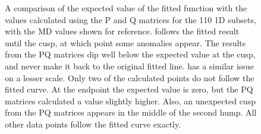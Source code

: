 \documentclass[twoside,senior]{BYUPhys}
\begin{document}
\begin{figure}[ht!]
 \centering
 
 \quad
 \caption[Comparison of the PQ matrices with the expected result for \textlangle{}110\textrangle{} 1D subset.]{\label{appfig:110PQ} A comparison of the expected value of the fitted function with the values calculated using the P and Q matrices for the \textlangle{}110\textrangle{} 1D subsets, with the MD values shown for reference.  \protect{} follows the fitted result until the cusp, at which point some anomalies appear.  The results from the PQ matrices dip well below the expected value at the cusp, and never make it back to the original fitted line. \protect{} has a similar issue on a lesser scale.  Only two of the calculated points do not follow the fitted curve.  At the endpoint the expected value is zero, but the PQ matrices calculated a value slightly higher.  Also, an unexpected cusp from the PQ matrices appears in the middle of the second hump.  All other data points follow the fitted curve exactly.}
\end{figure}
\end{document}
